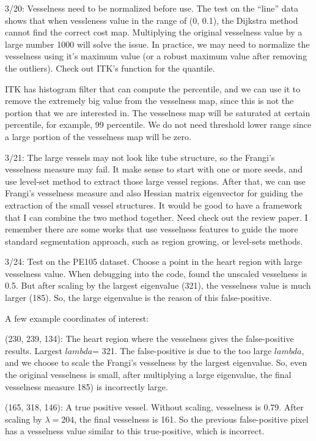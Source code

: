 \documentclass[12pt]{article}
\begin{document}
3/20: Vesselness need to be normalized before use. The test on the ``line''
data shows that when vessleness value in the range of (0, 0.1), the Dijkstra
method cannot find the correct cost map. Multiplying the original vesselness
value by a large number 1000 will solve the issue. In practice, we may need to
normalize the vesselness using it's maximum value (or a robust maximum value
after removing the outliers). Check out ITK's function for the quantile. 

ITK has histogram filter that can compute the percentile, and we can use it to
remove the extremely big value from the vesselness map, since this is not the
portion that we are interested in. The vesselness map will be saturated at
certain percentile, for example, 99 percentile. We do not need threshold lower
range since a large portion of the vesselness map will be zero.

3/21: The large vessels may not look like tube structure, so the Frangi's
vesselness measure may fail. It make sense to start with one or more seeds,
and use level-set method to extract those large vessel regions. After that, we
can use Frangi's vesselness measure and also Hessian matrix eigenvector for
guiding the extraction of the small vessel structures. It would be good to
have a framework that I can combine the two method together. Need check out
the review paper. I remember there are some works that use vesselness features
to guide the more standard segmentation approach, such as region growing, or
level-sets methods. 

3/24: Test on the PE105 dataset. Choose a point in the heart region with large
vesselness value. When debugging into the code, found the unscaled vesselness
is 0.5. But after scaling by the largest eigenvalue (321), the vesselness
value is much larger (185). So, the large eigenvalue is the reason of this
false-positive.

A few example coordinates of interest:

(230, 239, 134): The heart region where the vesselness gives the
false-positive results. Largest $lambda$= 321. The false-positive is due to
the too large $lambda$, and we choose to scale the Frangi's vesselness by the
largest eigenvalue. So, even the original vesselness is small, after
multiplying a large eigenvalue, the final vesselness measure 185) is incorrectly
large. 

(165, 318, 146): A true positive vessel. Without scaling, vesselness is
0.79. After scaling by $\lambda = 204$, the final vesselness is 161. So the
previous false-positive pixel has a vesselness value similar to this
true-positive, which is incorrect. 
\end{document}
